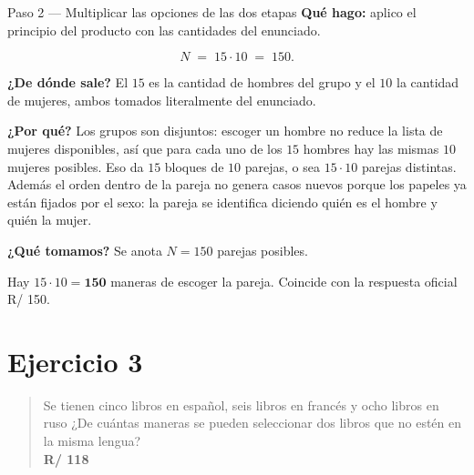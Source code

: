 \documentclass[11pt]{article}
\begin{document}
\begin{paso}{Paso 2 --- Multiplicar las opciones de las dos etapas}
\textbf{Qué hago:} aplico el principio del producto con las cantidades del enunciado.

\[
  N \;=\; 15\cdot 10 \;=\; 150 .
\]

\textbf{¿De dónde sale?} El $15$ es la cantidad de hombres del grupo y el $10$ la cantidad de mujeres, ambos tomados literalmente del enunciado.

\textbf{¿Por qué?} Los grupos son disjuntos: escoger un hombre no reduce la lista de mujeres disponibles, así que para cada uno de los $15$ hombres hay las mismas $10$ mujeres posibles. Eso da $15$ bloques de $10$ parejas, o sea $15\cdot 10$ parejas distintas. Además el orden dentro de la pareja no genera casos nuevos porque los papeles ya están fijados por el sexo: la pareja se identifica diciendo quién es el hombre y quién la mujer.

\textbf{¿Qué tomamos?} Se anota $N=150$ parejas posibles.
\end{paso}

\begin{resp}
Hay $15\cdot 10=\mathbf{150}$ maneras de escoger la pareja. Coincide con la respuesta oficial R/ 150.
\end{resp}

\section*{Ejercicio 3}

\begin{quote}
Se tienen cinco libros en español, seis libros en francés y ocho libros en ruso ¿De cuántas maneras se pueden seleccionar dos libros que no estén en la misma lengua?\\[2pt]
\textbf{R/ 118}
\end{quote}
\end{document}
